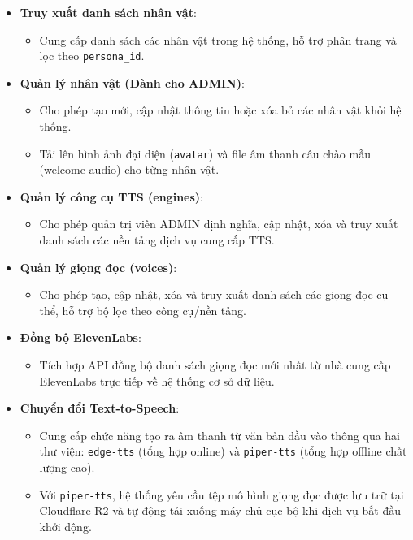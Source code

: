 \begin{itemize}
\item \textbf{Truy xuất danh sách nhân vật}:
\begin{itemize}
\item Cung cấp danh sách các nhân vật trong hệ thống, hỗ trợ phân trang và lọc theo \texttt{persona\_id}.
\end{itemize}

\item \textbf{Quản lý nhân vật (Dành cho ADMIN)}:
\begin{itemize}
\item Cho phép tạo mới, cập nhật thông tin hoặc xóa bỏ các nhân vật khỏi hệ thống.
\item Tải lên hình ảnh đại diện (\texttt{avatar}) và file âm thanh câu chào mẫu (welcome audio) cho từng nhân vật.
\end{itemize}

\item \textbf{Quản lý công cụ TTS (engines)}:
\begin{itemize}
\item Cho phép quản trị viên ADMIN định nghĩa, cập nhật, xóa và truy xuất danh sách các nền tảng dịch vụ cung cấp TTS.
\end{itemize}

\item \textbf{Quản lý giọng đọc (voices)}:
\begin{itemize}
\item Cho phép tạo, cập nhật, xóa và truy xuất danh sách các giọng đọc cụ thể, hỗ trợ bộ lọc theo công cụ/nền tảng.
\end{itemize}

\item \textbf{Đồng bộ ElevenLabs}:
\begin{itemize}
\item Tích hợp API đồng bộ danh sách giọng đọc mới nhất từ nhà cung cấp ElevenLabs trực tiếp về hệ thống cơ sở dữ liệu.
\end{itemize}

\item \textbf{Chuyển đổi Text-to-Speech}:
\begin{itemize}
\item Cung cấp chức năng tạo ra âm thanh từ văn bản đầu vào thông qua hai thư viện: \texttt{edge-tts} (tổng hợp online) và \texttt{piper-tts} (tổng hợp offline chất lượng cao).
\item Với \texttt{piper-tts}, hệ thống yêu cầu tệp mô hình giọng đọc được lưu trữ tại Cloudflare R2 và tự động tải xuống máy chủ cục bộ khi dịch vụ bắt đầu khởi động.
\end{itemize}


\end{itemize}
